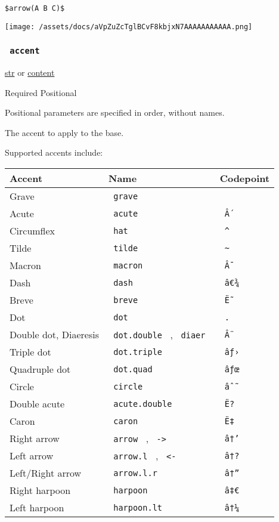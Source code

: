 \begin{verbatim}
$arrow(A B C)$
\end{verbatim}

\texttt{[image: /assets/docs/aVpZuZcTglBCvF8kbjxN7AAAAAAAAAAA.png]}

\subsubsection{\texorpdfstring{\texttt{\ accent\ }}{ accent }}\label{parameters-accent}

\href{/docs/reference/foundations/str/}{str} {or}
\href{/docs/reference/foundations/content/}{content}

{Required} {{ Positional }}

\label{parameters-accent-positional-tooltip}
Positional parameters are specified in order, without names.

The accent to apply to the base.

Supported accents include:

\begin{longtable}[]{@{}lll@{}}
\toprule\noalign{}
Accent & Name & Codepoint \\
\midrule\noalign{}
\endhead
\bottomrule\noalign{}
\endlastfoot
Grave & \texttt{\ grave\ } & \texttt{\ \textasciigrave{}\ } \\
Acute & \texttt{\ acute\ } & \texttt{\ Â´\ } \\
Circumflex & \texttt{\ hat\ } & \texttt{\ \^{}\ } \\
Tilde & \texttt{\ tilde\ } & \texttt{\ \textasciitilde{}\ } \\
Macron & \texttt{\ macron\ } & \texttt{\ Â¯\ } \\
Dash & \texttt{\ dash\ } & \texttt{\ â€¾\ } \\
Breve & \texttt{\ breve\ } & \texttt{\ Ë˜\ } \\
Dot & \texttt{\ dot\ } & \texttt{\ .\ } \\
Double dot, Diaeresis & \texttt{\ dot.double\ } , \texttt{\ diaer\ } &
\texttt{\ Â¨\ } \\
Triple dot & \texttt{\ dot.triple\ } & \texttt{\ âƒ›\ } \\
Quadruple dot & \texttt{\ dot.quad\ } & \texttt{\ âƒœ\ } \\
Circle & \texttt{\ circle\ } & \texttt{\ âˆ˜\ } \\
Double acute & \texttt{\ acute.double\ } & \texttt{\ Ë?\ } \\
Caron & \texttt{\ caron\ } & \texttt{\ Ë‡\ } \\
Right arrow & \texttt{\ arrow\ } , \texttt{\ -\textgreater{}\ } &
\texttt{\ â†’\ } \\
Left arrow & \texttt{\ arrow.l\ } , \texttt{\ \textless{}-\ } &
\texttt{\ â†?\ } \\
Left/Right arrow & \texttt{\ arrow.l.r\ } & \texttt{\ â†”\ } \\
Right harpoon & \texttt{\ harpoon\ } & \texttt{\ â‡€\ } \\
Left harpoon & \texttt{\ harpoon.lt\ } & \texttt{\ â†¼\ } \\
\end{longtable}


